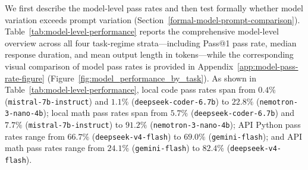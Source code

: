 \documentclass[a4paper,fleqn]{cas-sc}
\begin{document}
We first describe the model-level pass rates and then test formally whether model variation exceeds prompt variation (Section~\ref{formal-model-prompt-comparison}). Table~\ref{tab:model-level-performance} reports the comprehensive model-level overview across all four task-regime strata—including Pass@1 pass rate, median response duration, and mean output length in tokens—while the corresponding visual comparison of model pass rates is provided in Appendix~\ref{app:model-pass-rate-figure} (Figure~\ref{fig:model_performance_by_task}). As shown in Table~\ref{tab:model-level-performance}, local code pass rates span from $0.4\%$ (\texttt{mistral-7b-instruct}) and $1.1\%$ (\texttt{deepseek-coder-6.7b}) to $22.8\%$ (\texttt{nemotron-3-nano-4b}); local math pass rates span from $5.7\%$ (\texttt{deepseek-coder-6.7b}) and $7.7\%$ (\texttt{mistral-7b-instruct}) to $91.2\%$ (\texttt{nemotron-3-nano-4b}); API Python pass rates range from $66.7\%$ (\texttt{deepseek-v4-flash}) to $69.0\%$ (\texttt{gemini-flash}); and API math pass rates range from $24.1\%$ (\texttt{gemini-flash}) to $82.4\%$ (\texttt{deepseek-v4-flash}).
\end{document}
